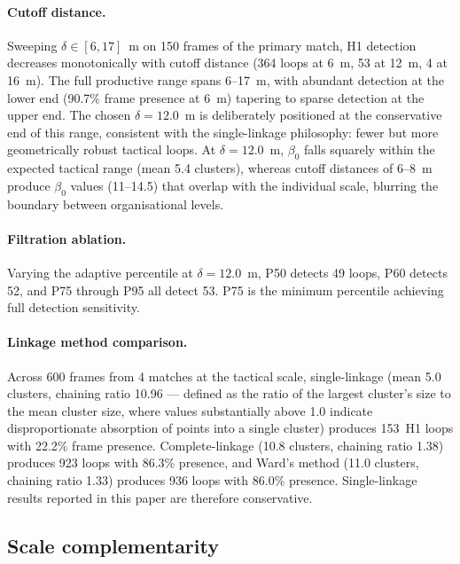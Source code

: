 \documentclass[11pt,a4paper]{article}
\begin{document}
\paragraph{Cutoff distance.}
Sweeping \(\delta \in [6, 17]\)~m on 150 frames of the
primary match, H1 detection decreases monotonically with
cutoff distance (364 loops at 6~m, 53 at 12~m, 4 at 16~m).
The full productive range spans 6--17~m, with abundant
detection at the lower end (90.7\% frame presence at 6~m)
tapering to sparse detection at the upper end.  The chosen
\(\delta = 12.0\)~m is deliberately positioned at the
conservative end of this range, consistent with the
single-linkage philosophy: fewer but more geometrically
robust tactical loops.  At \(\delta = 12.0\)~m,
\(\beta_0\) falls squarely within the expected tactical range
(mean 5.4 clusters), whereas cutoff distances of 6--8~m
produce \(\beta_0\) values (11--14.5) that overlap with the
individual scale, blurring the boundary between
organisational levels.

\paragraph{Filtration ablation.}
Varying the adaptive percentile at \(\delta = 12.0\)~m,
P50 detects 49 loops, P60 detects 52, and P75 through P95
all detect 53.  P75 is the minimum percentile achieving
full detection sensitivity.

\paragraph{Linkage method comparison.}
Across 600 frames from 4 matches at the tactical scale,
single-linkage (mean 5.0 clusters, chaining ratio 10.96 ---
defined as the ratio of the largest cluster's size to the
mean cluster size, where values substantially above 1.0
indicate disproportionate absorption of points into a single
cluster)
produces 153~H1 loops with 22.2\% frame presence.
Complete-linkage (10.8 clusters, chaining ratio 1.38)
produces 923 loops with 86.3\% presence, and Ward's method
(11.0 clusters, chaining ratio 1.33) produces 936 loops
with 86.0\% presence.  Single-linkage results reported in
this paper are therefore conservative.

\subsection{Scale complementarity}
\label{sec:complementarity}
\end{document}
